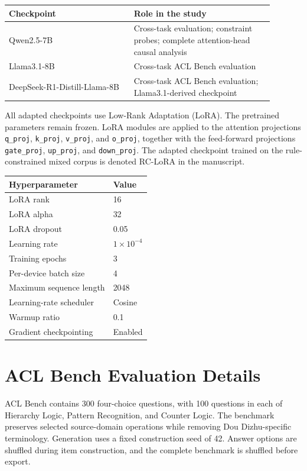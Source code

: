 \documentclass[11pt]{article}
\begin{document}
\begin{table}[h]
\centering
\small
\begin{tabular}{p{0.42\linewidth}p{0.47\linewidth}}
\toprule
Checkpoint & Role in the study \\
\midrule
Qwen2.5-7B & Cross-task evaluation; constraint probes; complete attention-head causal analysis \\
Llama3.1-8B & Cross-task ACL Bench evaluation \\
DeepSeek-R1-Distill-Llama-8B & Cross-task ACL Bench evaluation; Llama3.1-derived checkpoint \\
\bottomrule
\end{tabular}
\end{table}

All adapted checkpoints use Low-Rank Adaptation (LoRA). The pretrained parameters remain frozen. LoRA modules are applied to the attention projections \texttt{q\_proj}, \texttt{k\_proj}, \texttt{v\_proj}, and \texttt{o\_proj}, together with the feed-forward projections \texttt{gate\_proj}, \texttt{up\_proj}, and \texttt{down\_proj}. The adapted checkpoint trained on the rule-constrained mixed corpus is denoted RC-LoRA in the manuscript.

\begin{table}[h]
\centering
\small
\begin{tabular}{ll}
\toprule
Hyperparameter & Value \\
\midrule
LoRA rank & 16 \\
LoRA alpha & 32 \\
LoRA dropout & 0.05 \\
Learning rate & $1\times10^{-4}$ \\
Training epochs & 3 \\
Per-device batch size & 4 \\
Maximum sequence length & 2048 \\
Learning-rate scheduler & Cosine \\
Warmup ratio & 0.1 \\
Gradient checkpointing & Enabled \\
\bottomrule
\end{tabular}
\end{table}

\section{ACL Bench Evaluation Details}

ACL Bench contains 300 four-choice questions, with 100 questions in each of Hierarchy Logic, Pattern Recognition, and Counter Logic. The benchmark preserves selected source-domain operations while removing Dou Dizhu-specific terminology. Generation uses a fixed construction seed of 42. Answer options are shuffled during item construction, and the complete benchmark is shuffled before export.
\end{document}
